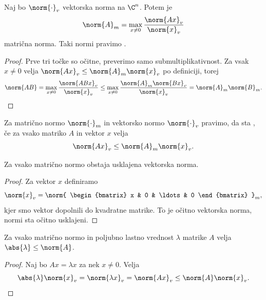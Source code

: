 
\begin{izrek}
  Naj bo $\norm{\cdot}_v$ vektorska norma na $\C^n$.
  Potem je
  \[
	\norm{A}_m = \max_{x \ne 0} \frac{\norm{A x}_v}{\norm{x}_v}
  \]
  matrična norma.
  Taki normi pravimo .
\end{izrek}

\begin{proof}
  Prve tri točke so očitne, preverimo samo submultiplikativnost.
  Za vsak $x \ne 0$ velja $\norm{A x}_v \le \norm{A}_m \norm{x}_v$ po
  definiciji, torej
  \[
	\norm{AB}
	= \max_{x \ne 0} \frac{\norm{ABx}_v}{\norm{x}_v}
	\le \max_{x \ne 0} \frac{\norm{A}_m \norm{Bx}_v}{\norm{x}_v}
	= \norm{A}_m \norm{B}_m.
  \]
\end{proof}


Za matrično normo $\norm{\cdot}_m$ in vektorsko normo $\norm{\cdot}_v$ pravimo,
da sta , če za vsako matriko $A$ in vektor $x$ velja
\[
  \norm{Ax}_v \le \norm{A}_m \norm{x}_v.
\]

\begin{lema}
  Za vsako matrično normo obstaja usklajena vektorska norma.
\end{lema}

\begin{proof}
  Za vektor $x$ definiramo
  \[
	\norm{x}_v =
	\norm{
	  \begin{bmatrix}
		x & 0 & \ldots & 0
	  \end{bmatrix}
	}_m,
  \]
  kjer smo vektor dopolnili do kvadratne matrike.
  To je očitno vektorska norma, normi sta očitno usklajeni.
\end{proof}


\begin{posledica}
  Za vsako matrično normo in poljubno lastno vrednost $\lambda$ matrike $A$
  velja $\abs{\lambda} \le \norm{A}$.
\end{posledica}

\begin{proof}
  Naj bo $Ax = \lambda x$ za nek $x \ne 0$.
  Velja
  \[
	\abs{\lambda} \norm{x}_v = \norm{\lambda x}_v = \norm{Ax}_v \le \norm{A}
	\norm{x}_v.
  \]
\end{proof}

